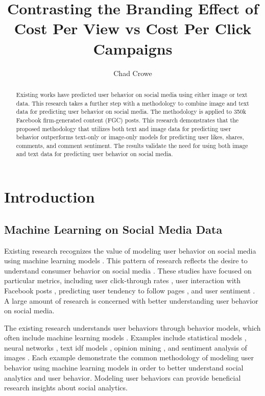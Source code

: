 \documentclass{article}
\begin{document}
\title{Contrasting the Branding Effect of Cost Per View vs Cost Per Click Campaigns}
\author{Chad Crowe}

\maketitle

\begin{abstract}

  Existing works have predicted user behavior on social media using either image or text data. This research takes a further step with a methodology to combine image and text data for predicting user behavior on social media. The methodology is applied to 350k Facebook firm-generated content (FGC) posts. This research demonstrates that the proposed methodology that utilizes both text and image data for predicting user behavior outperforms text-only or image-only models for predicting user likes, shares, comments, and comment sentiment. The results validate the need for using both image and text data for predicting user behavior on social media.

\end{abstract}
  
\section{Introduction}

\subsection{Machine Learning on Social Media Data}

Existing research recognizes the value of modeling user behavior on social media using machine learning models \cite{Li2015, 8029313, Ohsawa2013, Liu2012, Li2015}. This pattern of research reflects the desire to understand consumer behavior on social media \cite{Fisher2009}. These studies have focused on particular metrics, including user click-through rates \cite{Li2015}, user interaction with Facebook posts \cite{8029313}, predicting user tendency to follow pages \cite{Ohsawa2013}, and user sentiment \cite{Liu2012,Wang2015}. A large amount of research is concerned with better understanding user behavior on social media.

The existing research understands user behaviors through behavior models, which often include machine learning models \cite{Li2015, 8029313, Ohsawa2013, Liu2012, Li2015}.  Examples include statistical models \cite{Li2015}, neural networks \cite{8029313}, text idf models \cite{Ohsawa2013}, opinion mining \cite{Liu2012}, and sentiment analysis of images \cite{Wang2015}. Each  example demonstrate the common methodology of modeling user behavior using machine learning models in order to better understand social analytics and user behavior. Modeling user behaviors can provide beneficial research insights about social analytics.
\end{document}

